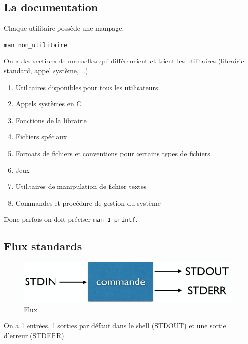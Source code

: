 \subsection{La documentation}\label{la-documentation}

Chaque utilitaire possède une manpage.

\texttt{man\ nom\_utilitaire}

On a des sections de manuelles qui différencient et trient les
utilitaires (librairie standard, appel système, \ldots)

\begin{enumerate}
\def\labelenumi{\arabic{enumi}.}
\tightlist
\item
  Utilitaires disponibles pour tous les utilisateurs
\item
  Appels systèmes en C
\item
  Fonctions de la librairie
\item
  Fichiers spéciaux
\item
  Formats de fichiers et conventions pour certains types de fichiers
\item
  Jeux
\item
  Utilitaires de manipulation de fichier textes
\item
  Commandes et procédure de gestion du système
\end{enumerate}

Donc parfois on doit préciser \texttt{man\ 1\ printf}.

\subsection{Flux standards}\label{flux-standards}

\begin{figure}
\centering
\includegraphics{image-4.png}
\caption{Flux}
\end{figure}

On a 1 entrées, 1 sorties par défaut dans le shell (STDOUT) et une
sortie d'erreur (STDERR)

